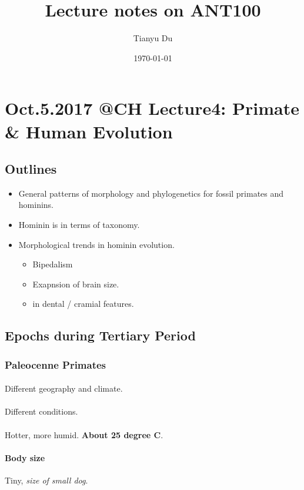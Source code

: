 \documentclass{article}
\author{Tianyu Du}
\date{\today}
\title{Lecture notes on ANT100}
\begin{document}
\maketitle
\tableofcontents

\section{Oct.5.2017 @CH Lecture4: Primate \& Human Evolution}
\subsection{Outlines}
\begin{itemize}
	\item General patterns of morphology and phylogenetics for fossil primates and hominins.
	\item Hominin is in terms of taxonomy.
	\item Morphological trends in hominin evolution.
	\begin{itemize}
		\item Bipedalism
		\item Exapnsion of brain size.
		\item in dental / cramial features.
	\end{itemize}
\end{itemize}
\subsection{Epochs during Tertiary Period}
\subsubsection{Paleocenne Primates}
	\paragraph{} Different geography and climate.
	\paragraph{} Different conditions.
	\paragraph{} Hotter, more humid. \textbf{About 25 degree C}.
	\paragraph{Body size} Tiny, \emph{size of small dog}.
\end{document}
